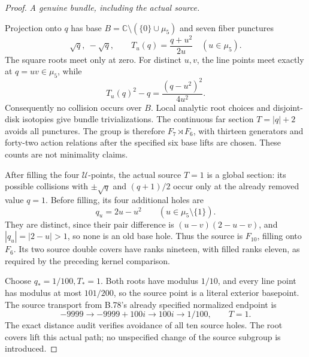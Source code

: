 \begin{proof}
\emph{A genuine bundle, including the actual source.}\par
Projection onto \(q\) has base
\(B=\mathbb C\setminus(\{0\}\cup\mu _5)\) and seven fiber
punctures
\[
       \sqrt q,\ -\sqrt q,\qquad
       T_u(q)=\frac{q+u^2}{2u}\quad(u\in\mu _5).
 \tag{B.81.3}
\]
The square roots meet only at zero. For distinct \(u,v\), the
line points meet exactly at \(q=uv\in\mu _5\), while
\[
                    T_u(q)^2-q=\frac{(q-u^2)^2}{4u^2}.
 \tag{B.81.4}
\]
Consequently no collision occurs over \(B\). Local analytic root
choices and disjoint-disk isotopies give bundle trivializations.
The continuous far section \(T=|q|+2\) avoids all punctures.
The group is therefore \(F_7\rtimes F_6\), with thirteen generators
and forty-two action relations after the specified six base lifts
are chosen. These counts are not minimality claims.

After filling the four \(\mathcal U\)-points, the actual source
\(T=1\) is a global section: its possible collisions with
\(\pm\sqrt q\) and \((q+1)/2\) occur only at the already removed
value \(q=1\). Before filling, its four additional holes are
\[
               q_u=2u-u^2\qquad(u\in\mu _5\setminus\{1\}).
 \tag{B.81.5}
\]
They are distinct, since their pair difference is
\((u-v)(2-u-v)\), and \(|q_u|=|2-u|>1\), so none is an old
base hole. Thus the source is \(F_{10}\), filling onto \(F_6\).
Its two source double covers have ranks nineteen, with filled ranks
eleven, as required by the preceding kernel comparison.

Choose \(q_*=1/100,T_*=1\). Both roots have modulus \(1/10\),
and every line point has modulus at most \(101/200\), so the
source point is a literal exterior basepoint. The source transport
from B.78's already specified normalized endpoint is
\[
 -9999\longrightarrow-9999+100i\longrightarrow100i
                       \longrightarrow1/100,\qquad T=1.
 \tag{B.81.6}
\]
The exact distance audit verifies avoidance of all ten source holes.
The root covers lift this actual path; no unspecified change of the
source subgroup is introduced.


\end{proof}
